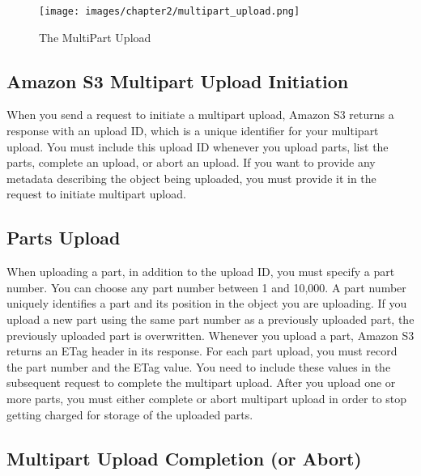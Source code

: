 \begin{figure}[htb] %
 \centering
 \texttt{[image: images/chapter2/multipart\_upload.png]}\hfill
 \caption[Multi part Upload]{The MultiPart Upload}
 \label{fig:fourV}
\end{figure}

\subsection{Amazon S3 Multipart Upload Initiation}
\label{subsec:amazon_S3_multipart_upload_initiation}

When you send a request to initiate a multipart upload, Amazon S3 returns a response with an upload ID, which is a unique identifier for your multipart upload. You must include this upload ID whenever you upload parts, list the parts, complete an upload, or abort an upload. If you want to provide any metadata describing the object being uploaded, you must provide it in the request to initiate multipart upload.


\subsection{Parts Upload}
\label{subsec:parts_upload}

When uploading a part, in addition to the upload ID, you must specify a part number. You can choose any part number between 1 and 10,000. A part number uniquely identifies a part and its position in the object you are uploading. If you upload a new part using the same part number as a previously uploaded part, the previously uploaded part is overwritten. Whenever you upload a part, Amazon S3 returns an ETag header in its response. For each part upload, you must record the part number and the ETag value. You need to include these values in the subsequent request to complete the multipart upload.
After you upload one or more parts, you must either complete or abort multipart upload in order to stop getting charged for storage of the uploaded parts. 


\subsection{Multipart Upload Completion (or Abort)}
\label{subsec:multipart_upload_completion}

